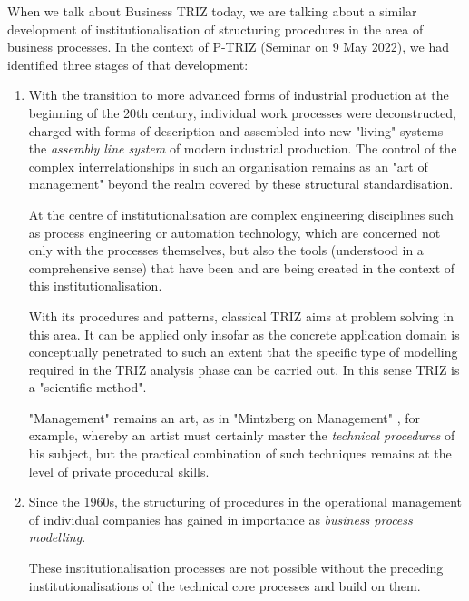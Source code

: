 \documentclass[11pt,a4paper]{article}
\begin{document}
When we talk about Business TRIZ today, we are talking about a similar
development of institutionalisation of structuring procedures in the area of
business processes.  In the context of P-TRIZ (Seminar on 9 May 2022), we had
identified three stages of that development:
\begin{enumerate}
\item With the transition to more advanced forms of industrial production at
  the beginning of the 20th century, individual work processes were
  deconstructed, charged with forms of description and assembled into new
  "living" systems -- the \emph{assembly line system} of modern industrial
  production. The control of the complex interrelationships in such an
  organisation remains as an "art of management" beyond the realm covered by
  these structural standardisation.

  At the centre of institutionalisation are complex engineering disciplines
  such as process engineering or automation technology, which are concerned
  not only with the processes themselves, but also the tools (understood in a
  comprehensive sense) that have been and are being created in the context of
  this institutionalisation.

  With its procedures and patterns, classical TRIZ aims at problem solving in
  this area. It can be applied only insofar as the concrete application domain
  is conceptually penetrated to such an extent that the specific type of
  modelling required in the TRIZ analysis phase can be carried out.  In this
  sense TRIZ is a "scientific method".

  "Management" remains an art, as in "Mintzberg on Management"
  \cite{Mintzberg}, for example, whereby an artist must certainly master the
  \emph{technical procedures} of his subject, but the practical combination of
  such techniques remains at the level of private procedural skills.
\item Since the 1960s, the structuring of procedures in the operational
  management of individual companies has gained in importance as
  \emph{business process modelling}.

  These institutionalisation processes are not possible without the preceding
  institutionalisations of the technical core processes and build on them.


\end{enumerate}
\end{document}

